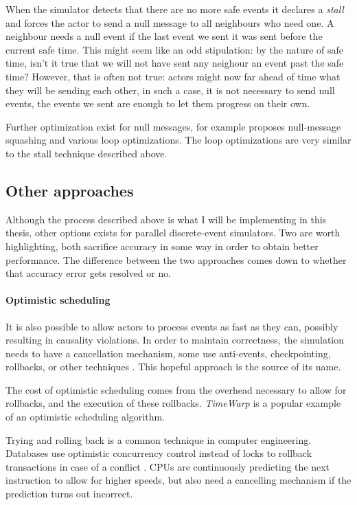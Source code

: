 When the simulator detects that there are no more safe events it declares a \emph{stall} and forces the actor to send a null message to all neighbours who need one.
A neighbour needs a null event if the last event we sent it was sent before the current safe time.
This might seem like an odd stipulation: by the nature of safe time, isn't it true that we will not have sent any neighour an event past the safe time?
However, that is often not true: actors might now far ahead of time what they will be sending each other, in such a case, it is not necessary to send null events, the events we sent are enough to let them progress on their own.

Further optimization exist for null messages, for example \cite{wang_enhanced_2016} proposes null-message squashing and various loop optimizations.
The loop optimizations are very similar to the stall technique described above.

\subsection{Other approaches}

Although the process described above is what I will be implementing in this thesis, other options exists for parallel discrete-event simulators.
Two are worth highlighting, both sacrifice accuracy in some way in order to obtain better performance.
The difference between the two approaches comes down to whether that accuracy error gets resolved or no.

\paragraph{Optimistic scheduling} \label{optimistic-scheduling}
It is also possible to allow actors to process events as fast as they can, possibly resulting in causality violations.
In order to maintain correctness, the simulation needs to have a cancellation mechanism, some use anti-events, checkpointing, rollbacks, or other techniques \cite{fujimoto_parallel_2015}.
This hopeful approach is the source of its name.

The cost of optimistic scheduling comes from the overhead necessary to allow for rollbacks, and the execution of these rollbacks.
\emph{TimeWarp} \cite{jefferson_virtual_1985} is a popular example of an optimistic scheduling algorithm.

Trying and rolling back is a common technique in computer engineering.
Databases use optimistic concurrency control instead of locks to rollback transactions in case of a conflict \cite{dragojevic_no_2015}.
CPUs are continuously predicting the next instruction to allow for higher speeds, but also need a cancelling mechanism if the prediction turns out incorrect.


